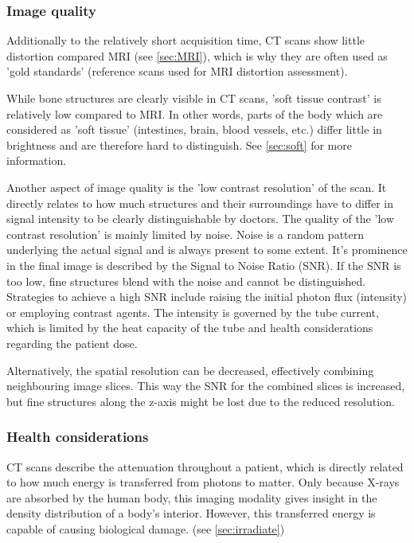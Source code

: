 \subsubsection{Image quality} %
Additionally to the relatively short acquisition time, CT scans show little distortion compared MRI (see \ref{sec:MRI}), which is why they are often used as 'gold standards' (reference scans used for MRI distortion assessment).

While bone structures are clearly visible in CT scans, 'soft tissue contrast' is relatively low compared to MRI.
In other words, parts of the body which are considered as 'soft tissue' (intestines, brain, blood vessels, etc.) differ little in brightness and are therefore hard to distinguish.
See \ref{sec:soft} for more information.

Another aspect of image quality is the 'low contrast resolution' of the scan.
It directly relates to how much structures and their surroundings have to differ in signal intensity to be clearly distinguishable by doctors.
The quality of the 'low contrast resolution' is mainly limited by noise.
Noise is a random pattern underlying the actual signal and is always present to some extent.
It's prominence in the final image is described by the Signal to Noise Ratio (SNR).
If the SNR is too low, fine structures blend with the noise and cannot be distinguished. 
Strategies to achieve a high SNR include raising the initial photon flux (intensity) or employing contrast agents.
The intensity is governed by the tube current, which is limited by the heat capacity of the tube and health considerations regarding the patient dose.

Alternatively, the spatial resolution can be decreased, effectively combining neighbouring image slices.
This way the SNR for the combined slices is increased, but fine structures along the z-axis might be lost due to the reduced resolution. \cite{Podgorsak, Maidment2014}

\subsubsection{Health considerations}
CT scans describe the attenuation throughout a patient, which is directly related to how much energy is transferred from photons to matter.
Only because X-rays are absorbed by the human body, this imaging modality gives insight in the density distribution of a body's interior.
However, this transferred energy is capable of causing biological damage. (see \ref{sec:irradiate})

